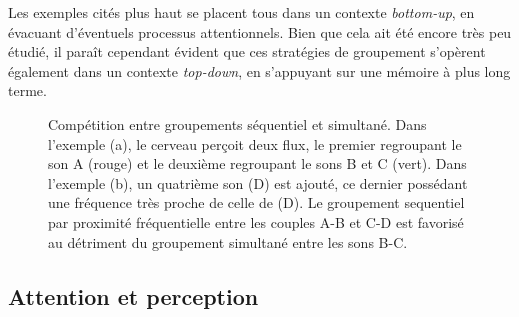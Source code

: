 Les exemples cités plus haut se placent tous dans un contexte \emph{bottom-up}, en évacuant d'éventuels processus attentionnels. Bien que cela ait été encore très peu étudié, il paraît cependant évident que ces stratégies de groupement s’opèrent également dans un contexte \emph{top-down}, en s'appuyant sur une mémoire à plus long terme.

\begin{figure}[bth]
        \myfloatalign
        \caption[Compétition entre groupements séquentiel et simultané]{Compétition entre groupements séquentiel et simultané. Dans l'exemple (a), le cerveau perçoit deux flux, le premier regroupant le son A (rouge) et le deuxième regroupant le sons B et C (vert). Dans l'exemple (b), un quatrième son (D) est ajouté, ce dernier possédant une fréquence très proche de celle de (D). Le groupement sequentiel par proximité fréquentielle entre les couples A-B et C-D est favorisé au détriment du groupement simultané entre les sons B-C.}\label{fig:simvsseq}
\end{figure}

\subsection{Attention et perception}

